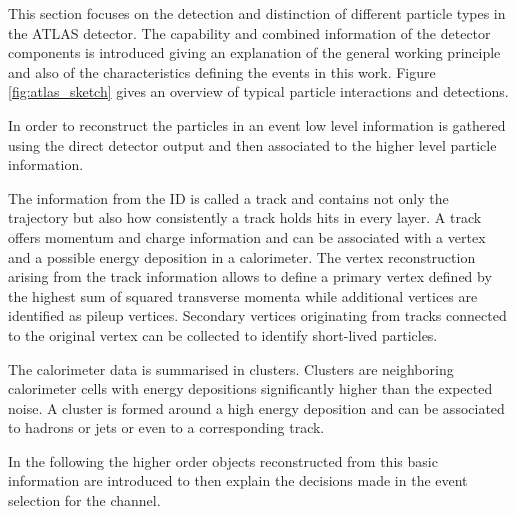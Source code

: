 This section focuses on the detection and distinction of different particle types in the ATLAS detector. The capability and combined information of the detector components is introduced giving an explanation of the general working principle and also of the characteristics defining the events in this work. Figure \ref{fig:atlas_sketch} gives an overview of typical particle interactions and detections.

In order to reconstruct the particles in an event low level information is gathered using the direct detector output and then associated to the higher level particle information.

The information from the ID is called a track and contains not only the trajectory but also how consistently a track holds hits in every layer. A track offers momentum and charge information and can be associated with a vertex and a possible energy deposition in a calorimeter. 
The vertex reconstruction arising from the track information allows to define a primary vertex defined by the highest sum of squared transverse momenta while additional vertices are identified as pileup vertices.
Secondary vertices originating from tracks connected to the original vertex can be collected to identify short-lived particles.

The calorimeter data is summarised in clusters. Clusters are neighboring calorimeter cells with energy depositions significantly higher than the expected noise. A cluster is formed around a high energy deposition and can be associated to hadrons or jets or even to a corresponding track.

In the following the higher order objects reconstructed from this basic information are introduced to then explain the decisions made in the event selection for the \tW channel.

